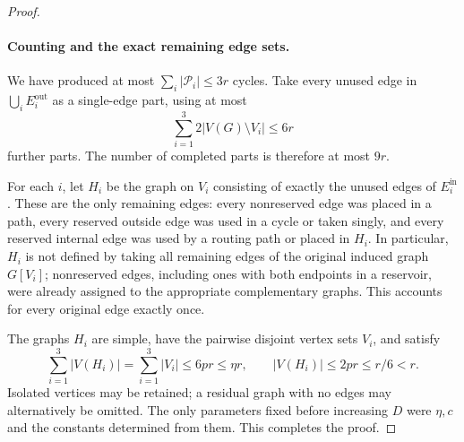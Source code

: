 \begin{proof}
\paragraph{Counting and the exact remaining edge sets.}
We have produced at most
$\sum_i|\mathcal P_i|\le3r$ cycles.  Take every unused edge in
$\bigcup_iE_i^{\mathrm{out}}$ as a single-edge part, using at most
\[
  \sum_{i=1}^3 2|V(G)\setminus V_i|\le6r
\]
further parts.  The number of completed parts is therefore at most
$9r$.

For each $i$, let $H_i$ be the graph on $V_i$ consisting of exactly
the unused edges of $E_i^{\mathrm{in}}$.  These are the only
remaining edges: every nonreserved edge was placed in a path,
every reserved outside edge was used in a cycle or taken singly,
and every reserved internal edge was used by a routing path or
placed in $H_i$.  In particular, $H_i$ is not defined by taking
all remaining edges of the original induced graph $G[V_i]$;
nonreserved edges, including ones with both endpoints in a
reservoir, were already assigned to the appropriate complementary
graphs.  This accounts for every original edge exactly once.

The graphs $H_i$ are simple, have the pairwise disjoint vertex sets
$V_i$, and satisfy
\begin{equation}\label{eq:residue-final-order}
  \sum_{i=1}^3|V(H_i)|
     =\sum_{i=1}^3|V_i|\le6pr\le\eta r,
  \qquad |V(H_i)|\le2pr\le r/6<r.
\end{equation}
Isolated vertices may be retained; a residual graph with no edges
may alternatively be omitted.  The only parameters fixed before
increasing $D$ were $\eta,c$ and the constants determined from
them.  This completes the proof.
\end{proof}

